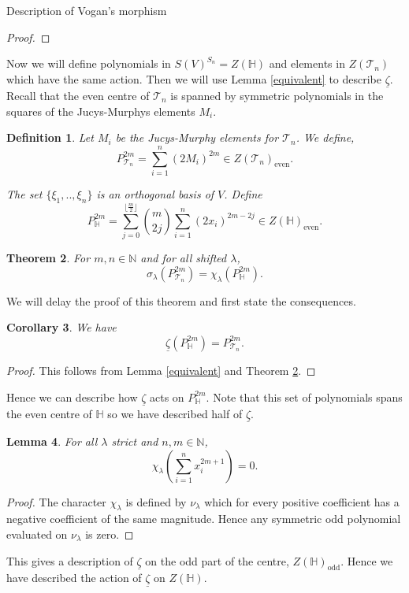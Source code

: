 \documentclass[a4paper,10pt]{amsart}
\newtheorem{theorem}{Theorem}[section]
\newtheorem{definition}[theorem]{Definition}
\newtheorem{corollary}[theorem]{Corollary}
\newtheorem{lemma}[theorem]{Lemma}
\DeclareMathOperator{\odd}{odd}
\DeclareMathOperator{\even}{even}
\begin{document}
\begin{section}{Description of Vogan's morphism}
\begin{proof}
\end{proof} 


Now we will define polynomials in $S(V)^{S_n}=Z(\mathbb{H})$ and elements in $Z(\mathcal{T}_n)$ which have the same action. Then we will use Lemma \ref{equivalent} to describe $\underline{\zeta}$.
Recall that the even centre of $\mathcal{T}_n$ is spanned by symmetric polynomials in the squares of the Jucys-Murphys elements $M_i$. 
\begin{definition} Let $M_i$ be the Jucys-Murphy elements for $\mathcal{T}_n$. We define,
$$P_{\mathcal{T}_n}^{2m} = \sum_{i=1}^n (2M_i)^{2m} \in Z(\mathcal{T}_n)_{\even}.$$

The set $\{\xi_1,..,\xi_n\}$ is an orthogonal basis of $V$. Define
$$P_{\mathbb{H}}^{2m} =  \sum_{j=0}^{\lfloor \frac{m}{2} \rfloor} {{m}\choose{2j}} \sum_{i=1}^n (2x_i)^{2m-2j}\in Z(\mathbb{H})_{\even}.$$
\end{definition} 

\begin{theorem}\label{action} For $m, n\in \mathbb{N}$ and for all shifted $\lambda$,
$$\sigma_\lambda(P_{\mathcal{T}_n}^{2m}) = \chi_\lambda(P_{\mathbb{H}}^{2m}).$$
\end{theorem} 

We will delay the proof of this theorem and first state the consequences.
\begin{corollary}We have 
$$\underline{\zeta}(P_{\mathbb{H}}^{2m}) = P_{\mathcal{T}_n}^{2m}.$$ \end{corollary}

\begin{proof}This follows from Lemma \ref{equivalent} and Theorem \ref{action}.\end{proof}
Hence we can describe how $\underline{\zeta}$ acts on $P^{2m}_\mathbb{H}$. Note that this set of polynomials spans the even centre of $\mathbb{H}$ so we have described half of $\underline{\zeta}$.

\begin{lemma} For all $\lambda$ strict and $n,m \in \mathbb{N}$,
$$\chi_\lambda(\sum_{i=1}^n x_i^{2m+1} )= 0.$$
\end{lemma}

\begin{proof} The character $\chi_\lambda$ is defined by $\nu_\lambda$ which for every positive coefficient has a negative coefficient of the same magnitude. Hence any symmetric odd polynomial evaluated on $\nu_\lambda$ is zero. \end{proof}
This gives a description of $\underline{\zeta}$ on the odd part of the centre, $Z(\mathbb{H})_{\odd}$. Hence we have described the action of $\underline{\zeta}$ on $Z(\mathbb{H})$.




\end{section}
\end{document}
